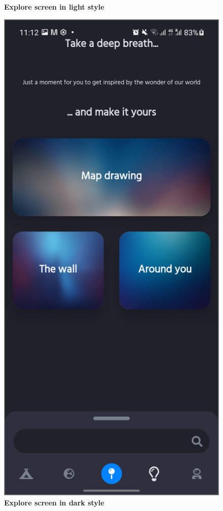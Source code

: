 \begin{figure}[!htb]
\begin{minipage}{.48\textwidth}
\caption{\label{fig:dbapiuser}\textbf{Explore screen in light style}}
\end{minipage} 
\begin{minipage}{.48\textwidth}
\centering
\includegraphics[width=.9\textwidth]{../Images/UI/ExploreDark.jpg}
\caption{\label{fig:dbapiuser}\textbf{Explore screen in dark style}}
\end{minipage}
\end{figure}

